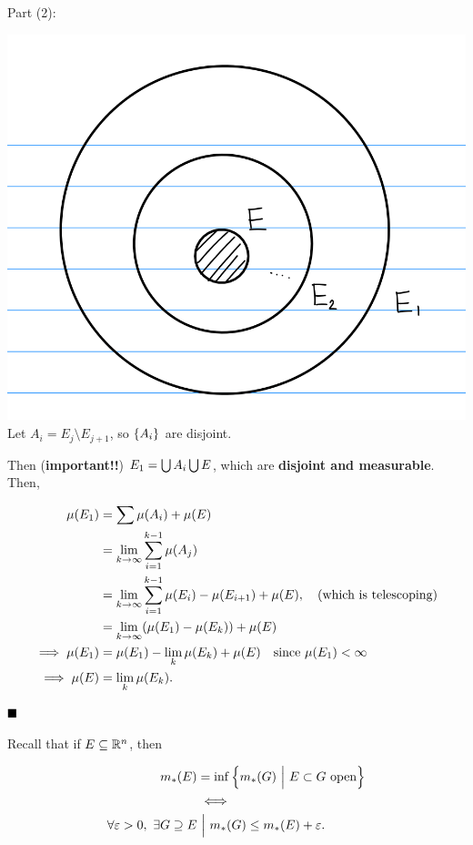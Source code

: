 Part (2):

\includegraphics{figures/2019-09-05-11:25.png}\\

Let \(A_i = E_j\setminus E_{j+1}\), so \(\left\{{A_i}\right\}\) are disjoint.

Then (\textbf{important!!}) \(E_1 = \bigcup A_i \bigcup E\), which are
\textbf{disjoint and measurable}. Then,

\begin{align*}
\mu(E_1) &= \sum \mu(A_i) + \mu(E) \\
&= \lim_{k\to\infty} \sum_{i=1}^{k-1} \mu(A_j) \\
&= \lim_{k\to\infty} \sum_{i=1}^{k-1} \mu(E_i) - \mu(E_{i+1}) + \mu(E),\quad\text{(which is telescoping)} \\
&= \lim_{k\to\infty} (\mu(E_1) - \mu(E_k)) + \mu(E) \\
\implies \mu(E_1) &= \mu(E_1) - \lim_k \mu(E_k) + \mu(E) \quad\text{since } \mu(E_1) < \infty \\
\implies \mu(E) &= \lim_k \mu(E_k) \hfill
.\end{align*}

\(\qed\)

Recall that if \(E\subseteq {\mathbb{R}}^n\), then

\begin{align*}
m_*(E) &= \inf\left\{{m_*(G) {~\mathrel{\Big|}~} E\subset G~\text{open}}\right\} \\
&\iff  \\ 
\forall \varepsilon > 0,~~ \exists G \supseteq E &{~\mathrel{\Big|}~} m_*(G) \leq m_*(E) + \varepsilon
.\end{align*}

